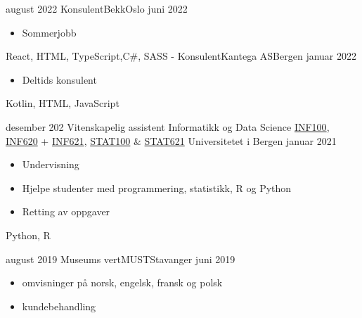 %
%
%
\begin{experiences}
    \experience
    {august 2022}   {Konsulent}{Bekk}{Oslo}
    {juni 2022} {
                      \begin{itemize}
                        \item Sommerjobb
                      \end{itemize}
                    }
                    {React, HTML, TypeScript,C\#, SASS }
  \emptySeparator
  \experience
    {-}   {Konsulent}{Kantega AS}{Bergen}
    {januar 2022} {
                      \begin{itemize}
                        \item Deltids konsulent 
                      \end{itemize}
                    }
                    {Kotlin, HTML, JavaScript}
  \emptySeparator
  
  \experience
    {desember 202}   {Vitenskapelig assistent Informatikk og Data Science }{ \href{https://www.uib.no/emne/INF100}{INF100}, \href{https://www.uib.no/emne/INF620}{INF620} + \href{https://www.uib.no/emne/INF621}{INF621}, \href{https://www.uib.no/emne/STAT100}{STAT100} \& \href{https://www.uib.no/emne/INF621}{STAT621} }{Universitetet i Bergen }
    {januar 2021} {
                      \begin{itemize}
                        \item Undervisning
                        \item Hjelpe studenter med programmering, statistikk, R  og Python
                        \item Retting av oppgaver
                      \end{itemize}
                    }
                    {Python, R}
  \emptySeparator
  
  \simpleexperience
    {august 2019}   {Museums vert}{MUST}{Stavanger}
    {juni 2019} {
                      \begin{itemize}
                        \item omvisninger på norsk, engelsk, fransk og polsk
                        \item kundebehandling
                      \end{itemize}
                    }
                    

\end{experiences}
